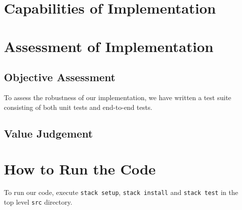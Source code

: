 \documentclass{article}
\begin{document}
\section{Capabilities of Implementation}



\section{Assessment of Implementation}

\subsection{Objective Assessment}
To assess the robustness of our implementation, we have written a test suite consisting of both unit tests and end-to-end tests. 

\subsection{Value Judgement}


\section{How to Run the Code}
To run our code, execute \texttt{stack setup}, \texttt{stack install} and \texttt{stack test} in the top level \texttt{src} directory.
\end{document}
